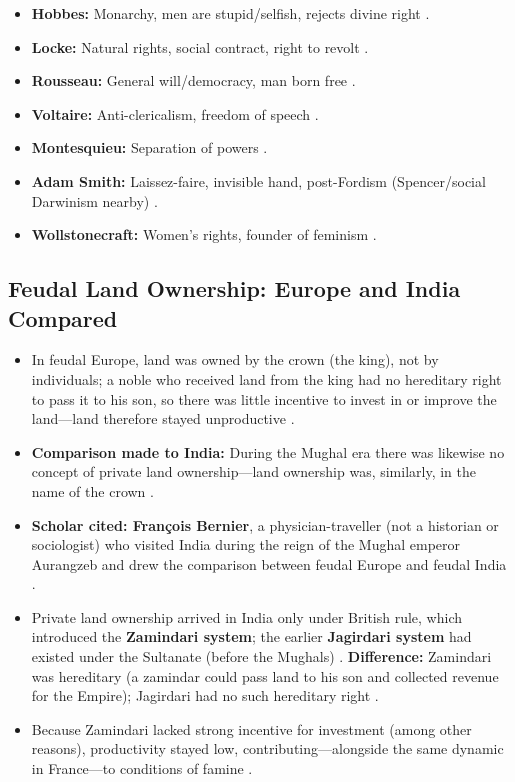 \begin{QuickRevision}
\begin{itemize}
    \item \textbf{Hobbes:} Monarchy, men are stupid/selfish, rejects divine right .
    \item \textbf{Locke:} Natural rights, social contract, right to revolt .
    \item \textbf{Rousseau:} General will/democracy, man born free .
    \item \textbf{Voltaire:} Anti-clericalism, freedom of speech .
    \item \textbf{Montesquieu:} Separation of powers .
    \item \textbf{Adam Smith:} Laissez-faire, invisible hand, post-Fordism (Spencer/social Darwinism nearby) .
    \item \textbf{Wollstonecraft:} Women's rights, founder of feminism .
\end{itemize}
\end{QuickRevision}

\subsection{Feudal Land Ownership: Europe and India Compared}

\begin{GovtPolicy}
\begin{itemize}
    \item In feudal Europe, land was owned by the crown (the king), not by individuals; a noble who received land from the king had no hereditary right to pass it to his son, so there was little incentive to invest in or improve the land---land therefore stayed unproductive .
    \item \textbf{Comparison made to India:} During the Mughal era there was likewise no concept of private land ownership---land ownership was, similarly, in the name of the crown .
    \item \textbf{Scholar cited: François Bernier}, a physician-traveller (not a historian or sociologist) who visited India during the reign of the Mughal emperor Aurangzeb and drew the comparison between feudal Europe and feudal India .
    \item Private land ownership arrived in India only under British rule, which introduced the \textbf{Zamindari system}; the earlier \textbf{Jagirdari system} had existed under the Sultanate (before the Mughals) . \textbf{Difference:} Zamindari was hereditary (a zamindar could pass land to his son and collected revenue for the Empire); Jagirdari had no such hereditary right .
    \item Because Zamindari lacked strong incentive for investment (among other reasons), productivity stayed low, contributing---alongside the same dynamic in France---to conditions of famine .
\end{itemize}
\end{GovtPolicy}


